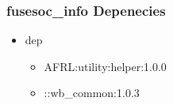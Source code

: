 \subsubsection{fusesoc\_info Depenecies}
\begin{itemize}
\item dep
	\begin{itemize}
	\item AFRL:utility:helper:1.0.0
	\item ::wb\_common:1.0.3
	\end{itemize}
\end{itemize}
